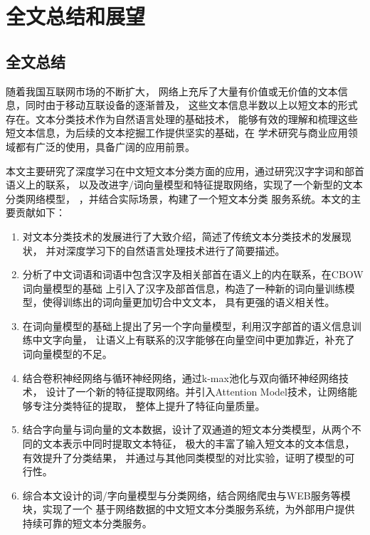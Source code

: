 \chapter{全文总结和展望}
\section{全文总结}
随着我国互联网市场的不断扩大，
网络上充斥了大量有价值或无价值的文本信息，同时由于移动互联设备的逐渐普及，
这些文本信息半数以上以短文本的形式存在。文本分类技术作为自然语言处理的基础技术，
能够有效的理解和梳理这些短文本信息，为后续的文本挖掘工作提供坚实的基础，在
学术研究与商业应用领域都有广泛的使用，具备广阔的应用前景。

本文主要研究了深度学习在中文短文本分类方面的应用，通过研究汉字字词和部首语义上的联系，
以及改进字/词向量模型和特征提取网络，实现了一个新型的文本分类网络模型，
，并结合实际场景，构建了一个短文本分类
服务系统。本文的主要贡献如下：
\begin{enumerate}
    \item 对文本分类技术的发展进行了大致介绍，简述了传统文本分类技术的发展现状，
    并对深度学习下的自然语言处理技术进行了简要描述。
    \item 分析了中文词语和词语中包含汉字及相关部首在语义上的内在联系，在CBOW词向量模型的基础
    上引入了汉字及部首信息，构造了一种新的词向量训练模型，使得训练出的词向量更加切合中文文本，
    具有更强的语义相关性。
    \item 在词向量模型的基础上提出了另一个字向量模型，利用汉字部首的语义信息训练中文字向量，
    让语义上有联系的汉字能够在向量空间中更加靠近，补充了词向量模型的不足。
    \item 结合卷积神经网络与循环神经网络，通过k-max池化与双向循环神经网络技术，
    设计了一个新的特征提取网络。并引入Attention Model技术，让网络能够专注分类特征的提取，
    整体上提升了特征向量质量。
    \item 结合字向量与词向量的文本数据，设计了双通道的短文本分类模型，从两个不同的文本表示中同时提取文本特征，
    极大的丰富了输入短文本的文本信息，有效提升了分类结果，
    并通过与其他同类模型的对比实验，证明了模型的可行性。
    \item 综合本文设计的词/字向量模型与分类网络，结合网络爬虫与WEB服务等模块，实现了一个
    基于网络数据的中文短文本分类服务系统，为外部用户提供持续可靠的短文本分类服务。
\end{enumerate}
